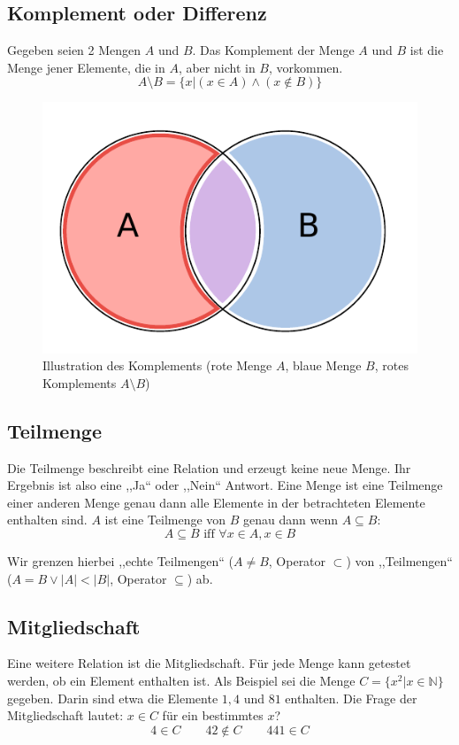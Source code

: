 \subsection{Komplement oder Differenz}
%
Gegeben seien 2 Mengen $A$ und $B$. Das Komplement der Menge $A$ und $B$
ist die Menge jener Elemente, die in $A$, aber nicht in $B$, vorkommen.
\[
    A \setminus B = \{x | (x \in A) \land (x \notin B)\}
\]
%
\begin{figure}[p]
 \begin{center}
  \includegraphics{img/complement.pdf}
  \caption{Illustration des Komplements (rote Menge $A$, blaue Menge $B$,
        rotes Komplements $A \setminus B$)}
  \label{fig:complement}
 \end{center}
\end{figure}

\subsection{Teilmenge}
%
Die Teilmenge beschreibt eine Relation und erzeugt keine neue Menge.
Ihr Ergebnis ist also eine ,,Ja`` oder ,,Nein`` Antwort.
Eine Menge ist eine Teilmenge einer anderen Menge genau dann alle
Elemente in der betrachteten Elemente enthalten sind. $A$ ist eine
Teilmenge von $B$ genau dann wenn $A \subseteq B$:
\[
    A \subseteq B \text{ iff } \forall x \in A, x \in B
\]

Wir grenzen hierbei ,,echte Teilmengen`` ($A \neq B$, Operator $\subset$)
von ,,Teilmengen`` ($A = B \lor |A| < |B|$, Operator $\subseteq$) ab.

\subsection{Mitgliedschaft}
%
Eine weitere Relation ist die Mitgliedschaft.
Für jede Menge kann getestet werden, ob ein Element enthalten ist. Als Beispiel
sei die Menge $C = \{x^2 | x \in \mathbb{N}\}$ gegeben. Darin sind etwa die Elemente
$1, 4$ und $81$ enthalten. Die Frage der Mitgliedschaft lautet: $x \in C$ für
ein bestimmtes $x$?
\[
  4 \in C  \qquad  42 \notin C  \qquad  441 \in C
\]

